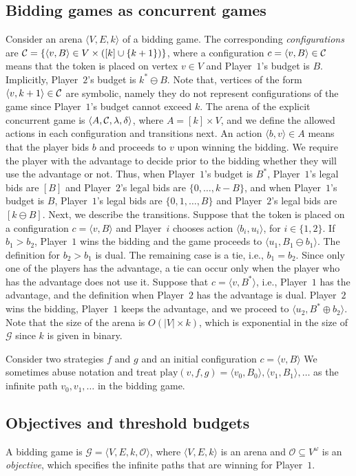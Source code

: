 \documentclass{article}\providecommand{\nequiv}{\not\equiv}\usepackage[a4paper,margin=20mm]{geometry}
\newcommand{\PO}{Player~$1$\xspace}
\newcommand{\PT}{Player~$2$\xspace}
\newcommand{\PLi}{Player~$i$\xspace}
\newcommand{\C}{{\cal C}}
\newcommand{\G}{{\mathcal G}}
\newcommand{\play}{\text{play}\xspace}
\newcommand{\zug}[1]{\langle #1  \rangle}
\renewcommand{\set}[1]{\{ #1  \}}
\newcommand{\Obj}{\mathcal{O}}
\begin{document}
\subsection{Bidding games as concurrent games}
\label{sec:bidding2conc}
Consider an arena $\zug{V, E, k}$ of a bidding game. 
The corresponding {\em configurations} are $\C = \set{\zug{v, B} \in V \times ([k] \cup \{k+1\})}$, where a configuration $c = \zug{v, B} \in \C$ means that the token is placed on vertex \(v \in V\) and \PO's budget is \(B\). Implicitly, \PT's budget is \(k^* \ominus B\). 
Note that, vertices of the form \(\zug{v, k+1} \in \C\) are symbolic, namely they do not represent configurations of the game since \PO's budget cannot exceed $k$. 
The arena of the explicit concurrent game is $\zug{A, \C, \lambda, \delta}$, where $A = [k] \times V$, and we define the allowed actions in each configuration and transitions next. 
An action \(\zug{b, v} \in A\) means that the player bids \(b\) and proceeds to \(v\) upon winning the bidding. 
We require the player with the advantage to decide prior to the bidding whether they will use the advantage or not. 
Thus, when \PO's budget is $B^*$, \PO's legal bids are $[B]$ and \PT's legal bids are $\set{0,\ldots, k- B}$, and when \PO's budget is $B$, \PO's legal bids are $\set{0,1,\ldots, B}$ and \PT's legal bids are $[k \ominus B]$.
Next, we describe the transitions.
Suppose that the token is placed on a configuration $c = \zug{v, B}$ and \PLi chooses action $\zug{b_i, u_i}$, for $i \in \set{1,2}$. If $b_1 > b_2$, \PO wins the bidding and the game proceeds to $\zug{u_1, B_1 \ominus b_1}$. The definition for $b_2 > b_1$ is dual. 
The remaining case is a tie, i.e., $b_1 = b_2$. Since only one of the players has the advantage, a tie can occur only when the player who has the advantage does not use it. Suppose that $c = \zug{v, B^*}$, i.e., \PO has the advantage, and the definition when \PT has the advantage is dual. 
\PT wins the bidding, \PO keeps the advantage, and we proceed to $\zug{u_2, B^* \oplus b_2}$. 
Note that the size of the arena is $O(|V|  \times k)$, which is exponential in the size of $\G$ since $k$ is given in binary.

Consider two strategies $f$ and $g$ and an initial configuration $c = \zug{v, B}$
We sometimes abuse notation and treat $\play(v, f, g) = \zug{v_0, B_0}, \zug{v_1, B_1},\ldots$ as the infinite path $v_0,v_1,\ldots$ in the bidding game.




\subsection{Objectives and threshold budgets}
\label{sec:prelim-obj}
A bidding game is $\G = \zug{V, E, k, \Obj}$, where $\zug{V, E, k}$ is an arena and $\Obj \subseteq V^\omega$ is an {\em objective}, which specifies the infinite paths that are winning for \PO. 
\end{document}
